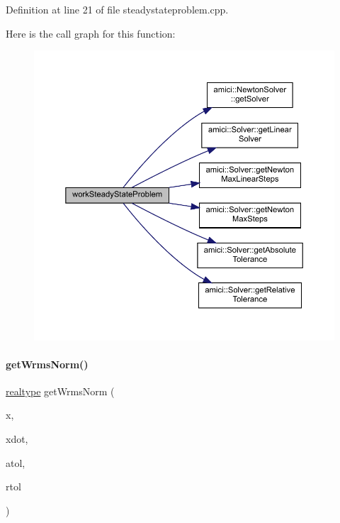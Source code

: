 Definition at line 21 of file steadystateproblem.\+cpp.

Here is the call graph for this function\+:
\nopagebreak
\begin{figure}[H]
\begin{center}
\leavevmode
\includegraphics[width=350pt]{classamici_1_1_steadystate_problem_aa2630b3401b8f0a50bf50c73d4f39790_cgraph}
\end{center}
\end{figure}
\mbox{\label{classamici_1_1_steadystate_problem_afd3dce48510d1fce72b18049b40fff5a}} 
\paragraph{\texorpdfstring{getWrmsNorm()}{getWrmsNorm()}}
{\footnotesize\ttfamily \mbox{\hyperlink{namespaceamici_a1bdce28051d6a53868f7ccbf5f2c14a3}{realtype}} get\+Wrms\+Norm (\begin{DoxyParamCaption}\item[{\mbox{\hyperlink{classamici_1_1_ami_vector}{Ami\+Vector}} const \&}]{x,  }\item[{\mbox{\hyperlink{classamici_1_1_ami_vector}{Ami\+Vector}} const \&}]{xdot,  }\item[{\mbox{\hyperlink{namespaceamici_a1bdce28051d6a53868f7ccbf5f2c14a3}{realtype}}}]{atol,  }\item[{\mbox{\hyperlink{namespaceamici_a1bdce28051d6a53868f7ccbf5f2c14a3}{realtype}}}]{rtol }\end{DoxyParamCaption})}

